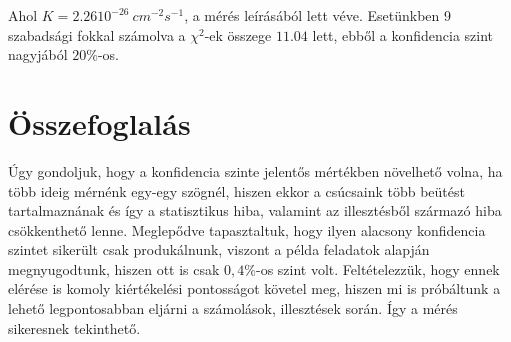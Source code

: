 \documentclass[a4paper,12pt]{article}
\begin{document}
\par Ahol $K = 2.26 10^{-26}~cm^{-2}s^{-1}$, a mérés leírásából lett véve. Esetünkben 9 szabadsági fokkal számolva a $\chi^{2}$-ek összege $11.04$ lett, ebből a konfidencia szint nagyjából $20\%$-os.

\section{Összefoglalás}
\par Úgy gondoljuk, hogy a konfidencia szinte jelentős mértékben növelhető volna, ha több ideig mérnénk egy-egy szögnél, hiszen ekkor a csúcsaink több beütést tartalmaznának és így a statisztikus hiba, valamint az illesztésből származó hiba csökkenthető lenne. Meglepődve tapasztaltuk, hogy ilyen alacsony konfidencia szintet sikerült csak produkálnunk, viszont a példa feladatok alapján megnyugodtunk, hiszen ott is csak $0,4\%$-os szint volt. Feltételezzük, hogy ennek elérése is komoly kiértékelési pontosságot követel meg, hiszen mi is próbáltunk a lehető legpontosabban eljárni a számolások, illesztések során. Így a mérés sikeresnek tekinthető.
\end{document}

